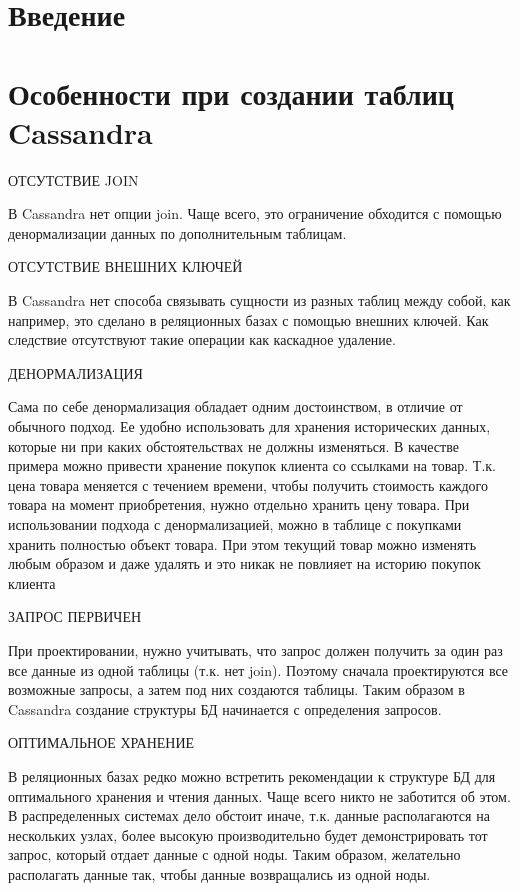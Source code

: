 \section*{\LARGE Введение}
\section{Особенности при создании таблиц Cassandra}
ОТСУТСТВИЕ JOIN \par
В Cassandra нет опции join. Чаще всего, это ограничение обходится с
помощью денормализации данных по дополнительным таблицам.

ОТСУТСТВИЕ ВНЕШНИХ КЛЮЧЕЙ \par
В Cassandra нет способа связывать сущности из разных таблиц между
собой, как например, это сделано в реляционных базах с помощью внешних
ключей. Как следствие отсутствуют такие операции как каскадное удаление.

ДЕНОРМАЛИЗАЦИЯ \par
Сама по себе денормализация обладает одним достоинством, в отличие от
обычного подход. Ее удобно использовать для хранения исторических данных,
которые ни при каких обстоятельствах не должны изменяться. В качестве
примера можно привести хранение покупок клиента со ссылками на товар. Т.к.
цена товара меняется с течением времени, чтобы получить стоимость каждого
товара на момент приобретения, нужно отдельно хранить цену товара. При
использовании подхода с денормализацией, можно в таблице с покупками
хранить полностью объект товара. При этом текущий товар можно изменять
любым образом и даже удалять и это никак не повлияет на историю покупок
клиента

ЗАПРОС ПЕРВИЧЕН \par
При проектировании, нужно учитывать, что запрос должен получить за
один раз все данные из одной таблицы (т.к. нет join). Поэтому сначала
проектируются все возможные запросы, а затем под них создаются таблицы.
Таким образом в Cassandra создание структуры БД начинается с определения
запросов.

ОПТИМАЛЬНОЕ ХРАНЕНИЕ \par
В реляционных базах редко можно встретить рекомендации к структуре
БД для оптимального хранения и чтения данных. Чаще всего никто не заботится
об этом. В распределенных системах дело обстоит иначе, т.к. данные
располагаются на нескольких узлах, более высокую производительно будет
демонстрировать тот запрос, который отдает данные с одной ноды. Таким
образом, желательно располагать данные так, чтобы данные возвращались из
одной ноды.

\clearpage
